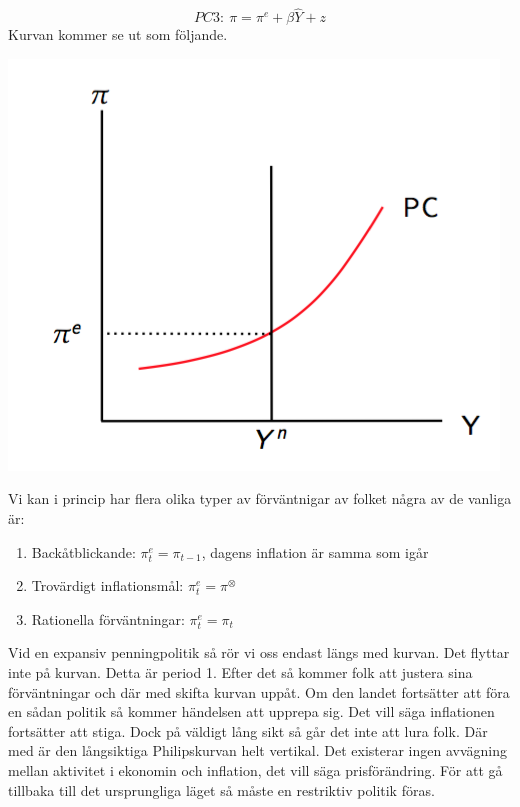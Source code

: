 \documentclass{article}
\begin{document}
$$
PC3: \ \pi = \pi^e + \beta \hat{Y} + z
$$
Kurvan kommer se ut som följande. 

\includegraphics[scale=0.6]{skarm10} 
\vspace{5mm} \par \noindent 

Vi kan i princip har flera olika typer av förväntnigar av folket några av de vanliga är: 
\begin{enumerate}
 \item Backåtblickande: $ \pi^e_t = \pi_{t-1}$, dagens inflation är samma som igår 
 \item Trovärdigt inflationsmål: $ \pi^e_t = \pi^{\otimes}$
 \item Rationella förväntningar: $ \pi^e_t = \pi_t$ 
 \end{enumerate}

Vid en expansiv penningpolitik så rör vi oss endast längs med kurvan. Det flyttar inte på kurvan. Detta är period 1. Efter det så kommer folk att justera sina förväntningar och där med skifta kurvan uppåt. Om den landet fortsätter att föra en sådan politik så kommer händelsen att upprepa sig. Det vill säga inflationen fortsätter att stiga. Dock på väldigt lång sikt så går det inte att lura folk. Där med är den långsiktiga Philipskurvan helt vertikal. Det existerar ingen avvägning mellan aktivitet i ekonomin och inflation, det vill säga prisförändring. För att gå tillbaka till det ursprungliga läget så måste en restriktiv politik föras. \vspace{5mm} \par \noindent 
\end{document}
